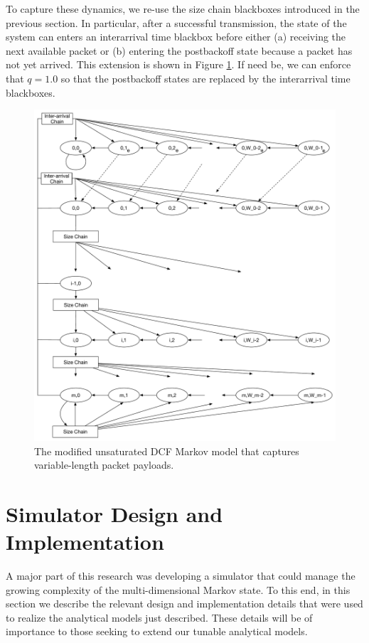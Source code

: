 \documentclass{llncs}
\begin{document}
To capture these dynamics, we re-use the size chain blackboxes introduced in the previous section. In particular, after a successful transmission, the state of the system can enters an interarrival time blackbox before either (a) receiving the next available packet or (b) entering the postbackoff state because a packet has not yet arrived. This extension is shown in Figure \ref{fig:dcf_model_unsaturated_varpktsize_interarrival}. If need be, we can enforce that $q = 1.0$ so that the postbackoff states are replaced by the interarrival time blackboxes. 

\begin{figure}
\begin{center}
\includegraphics[scale=0.35]{../../sketches/dcf_model_unsaturated_varpktsize_interarrival.pdf}
\caption{The modified unsaturated DCF Markov model that captures variable-length packet payloads.}
\label{fig:dcf_model_unsaturated_varpktsize_interarrival}
\end{center}
\end{figure}

\section{Simulator Design and Implementation}
A major part of this research was developing a simulator that could manage the growing complexity of the multi-dimensional Markov state. To this end, in this section we describe the relevant design and implementation details that were used to realize the analytical models just described. These details will be of importance to those seeking to extend our tunable analytical models. 
\end{document}
